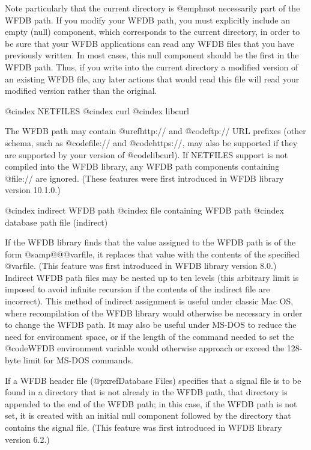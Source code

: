 {Note particularly that the current directory is @emph{not} necessarily
part of the WFDB path.  If you modify your WFDB path, you must
explicitly include an empty (null) component, which corresponds to the
current directory, in order to be sure that your WFDB applications can
read any WFDB files that you have previously written.  In most cases,
this null component should be the first in the WFDB path.  Thus, if you
write into the current directory a modified version of an existing WFDB
file, any later actions that would read this file will read your
modified version rather than the original.

@cindex NETFILES
@cindex curl
@cindex libcurl

The WFDB path may contain @uref{http://} and @code{ftp://} URL prefixes (other
schema, such as @code{file://} and @code{https://}, may also be supported if
they are supported by your version of @code{libcurl}).  If NETFILES support is
not compiled into the WFDB library, any WFDB path components containing
@file{://} are ignored.  (These features were first introduced in WFDB library
version 10.1.0.)

@cindex indirect WFDB path
@cindex file containing WFDB path
@cindex database path file (indirect)

If the WFDB library finds that the value assigned to the WFDB path is of the
form @samp{@@@var{file}}, it replaces that value with the contents of
the specified @var{file}.  (This feature was first introduced in WFDB
library version 8.0.)  Indirect WFDB path files may be nested up to ten
levels (this arbitrary limit is imposed to avoid infinite recursion if
the contents of the indirect file are incorrect).  This method of
indirect assignment is useful under classic Mac OS, where recompilation of
the WFDB library would otherwise be necessary in order to change the WFDB
path.  It may also be useful under MS-DOS to reduce the need for
environment space, or if the length of the command needed to set the
@code{WFDB} environment variable would otherwise approach or exceed the
128-byte limit for MS-DOS commands.

If a WFDB header file (@pxref{Database Files}) specifies that a signal
file is to be found in a directory that is not already in the WFDB path,
that directory is appended to the end of the WFDB path; in this case, if
the WFDB path is not set, it is created with an initial null component
followed by the directory that contains the signal file.  (This feature
was first introduced in WFDB library version 6.2.)

}
